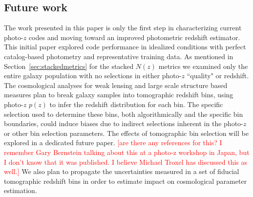 \documentclass[usenatbib]{mn2e}
\newcommand{\red}[1]{\textcolor{red}{#1}}
\begin{document}
\subsection{Future work}
\label{sec:futurework}
The work presented in this paper is only the first step in characterizing current photo-$z$ codes and moving toward an improved photometric redshift estimator.  This initial paper explored code performance in idealized conditions with perfect catalog-based photometry and representative training data.  As mentioned in Section~\ref{sec:stackedmetrics} for the stacked $N(z)$ metrics we examined only the entire galaxy population with no selections in either photo-$z$ ``quality" or redshift.  The cosmological analyses for weak lensing and large scale structure based measures plan to break galaxy samples into tomographic redshift bins, using photo-$z$ $p(z)$ to infer the redshift distribution for each bin.  The specific selection used to determine these bins, both algorithmically and the specific bin boundaries, could induce biases due to indirect selections inherent in the photo-$z$ or other bin selection parameters.  The effects of tomographic bin selection will be explored in a dedicated future paper. \red{[are there any references for this?  I remember Gary Bernstein talking about this at a photo-z workshop in Japan, but I don't know that it was published.  I believe Michael Troxel has discussed this as well.]}
We also plan to propagate the uncertainties measured in a set of fiducial tomographic redshift bins in order to estimate impact on cosmological parameter estimation.
\end{document}
